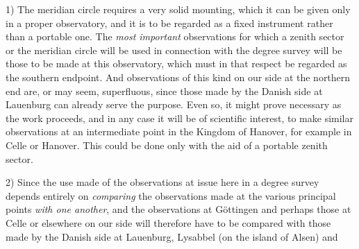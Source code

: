 1) The meridian circle requires a very solid mounting, which it can be given only in a proper observatory, and it is to be regarded as a fixed instrument rather than a portable one. The \textit{most important} observations for which a zenith sector or the meridian circle will be used in connection with the degree survey will be those to be made at this observatory, which must in that respect be regarded as the southern endpoint. And observations of this kind on our side at the northern end are, or may seem, superfluous, since those made by the Danish side at Lauenburg can already serve the purpose. Even so, it might prove necessary as the work proceeds, and in any case it will be of scientific interest, to make similar observations at an intermediate point in the Kingdom of Hanover, for example in Celle or Hanover. This could be done only with the aid of a portable zenith sector.

2) Since the use made of the observations at issue here in a degree survey depends entirely on \textit{comparing} the observations made at the various principal points \textit{with one another}, and the observations at Göttingen and perhaps those at Celle or elsewhere on our side will therefore have to be compared with those made by the Danish side at Lauenburg, Lysabbel (on the island of Alsen) and

